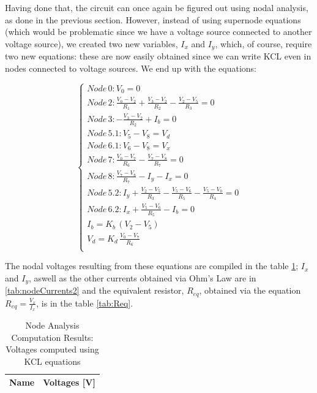 Having done that, the circuit can once again be figured out using nodal analysis, as done in the previous section. However, instead of using supernode equations
(which would be problematic since we have a voltage source connected to another voltage source), we created two new variables, $I_x$ and $I_y$, which, of course,
require two new equations: these are now easily obtained since we can write KCL even in nodes connected to voltage sources. We end up with the equations:

\begin{equation} 
\begin{cases}

    Node\, 0: V_0 = 0 \\
    Node\, 2: \frac{V_0 - V_2}{R_1} + \frac{V_3 - V_2}{R_2} - \frac{V_2 - V_5}{R_3} = 0 \\
    Node\, 3: -\frac{V_3 - V_2}{R_2} + I_b = 0 \\
    Node\, 5.1: V_5 - V_8 = V_d \\
    Node\, 6.1: V_6 - V_8 = V_x \\
    Node\, 7: \frac{V_0 - V_7}{R_6} - \frac{V_7 - V_8}{R_7} = 0 \\
    Node\, 8: \frac{V_7 - V_8}{R_7} - I_y - I_x = 0 \\
    Node\, 5.2: I_y + \frac{V_2 - V_5}{R_3} - \frac{V_5 - V_6}{R_5} - \frac{V_5 - V_0}{R_4} = 0 \\
    Node\, 6.2: I_x + \frac{V_5 - V_6}{R_5} - I_b = 0 \\
    I_b = K_b\,(V_2 - V_5) \\
    V_d = K_d\,\frac{V_0 - V_7}{R_6}\\
    
\end{cases}
\label{eq:2}
\end{equation}

The nodal voltages resulting from these equations are compiled in the table \ref{tab:nodeVoltages2}; $I_x$ and $I_y$, aswell as the other currents obtained via
Ohm's Law are in \ref{tab:nodeCurrents2} and the equivalent resistor, $R_{eq}$, obtained via the equation $R_{eq} = \frac{V_x}{I_x}$, is in the table \ref{tab:Req}.

\begin{table}[h]
  \centering
  \begin{tabular}{|l|r|}
    \hline    
    {\bf Name} & {\bf Voltages [V]} \\ \hline
    
  \end{tabular}
  \caption{Node Analysis Computation Results: Voltages computed using KCL equations}
  \label{tab:nodeVoltages2}
\end{table}


